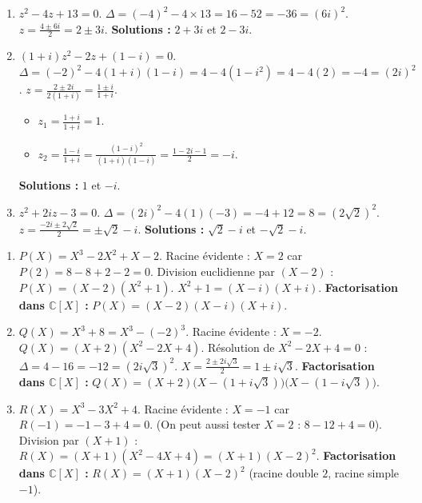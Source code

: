 \documentclass[11pt]{article}
\begin{document}
\begin{corrige}
\begin{enumerate}
\item $z^2 - 4z + 13 = 0$. $\Delta = (-4)^2 - 4 \times 13 = 16 - 52 = -36 = (6i)^2$.
$z = \frac{4 \pm 6i}{2} = 2 \pm 3i$.
\textbf{Solutions :} $\boxed{2+3i}$ et $\boxed{2-3i}$.

\item $(1+i)z^2 - 2z + (1-i) = 0$.
$\Delta = (-2)^2 - 4(1+i)(1-i) = 4 - 4(1 - i^2) = 4 - 4(2) = -4 = (2i)^2$.
$z = \frac{2 \pm 2i}{2(1+i)} = \frac{1 \pm i}{1+i}$.
\begin{itemize}
\item $z_1 = \frac{1+i}{1+i} = 1$.
\item $z_2 = \frac{1-i}{1+i} = \frac{(1-i)^2}{(1+i)(1-i)} = \frac{1 - 2i - 1}{2} = -i$.
\end{itemize}
\textbf{Solutions :} $\boxed{1}$ et $\boxed{-i}$.

\item $z^2 + 2iz - 3 = 0$.
$\Delta = (2i)^2 - 4(1)(-3) = -4 + 12 = 8 = (2\sqrt{2})^2$.
$z = \frac{-2i \pm 2\sqrt{2}}{2} = \pm \sqrt{2} - i$.
\textbf{Solutions :} $\boxed{\sqrt{2} - i}$ et $\boxed{-\sqrt{2} - i}$.
\end{enumerate}
\end{corrige}

\begin{corrige}
\begin{enumerate}
\item $P(X) = X^3 - 2X^2 + X - 2$.
Racine évidente : $X=2$ car $P(2) = 8 - 8 + 2 - 2 = 0$.
Division euclidienne par $(X-2)$ : $P(X) = (X-2)(X^2 + 1)$.
$X^2+1 = (X-i)(X+i)$.
\textbf{Factorisation dans $\mathbb{C}[X]$ :} $\boxed{P(X) = (X-2)(X-i)(X+i)}$.

\item $Q(X) = X^3 + 8 = X^3 - (-2)^3$. Racine évidente : $X = -2$.
$Q(X) = (X+2)(X^2 - 2X + 4)$.
Résolution de $X^2 - 2X + 4 = 0$ : $\Delta = 4 - 16 = -12 = (2i\sqrt{3})^2$.
$X = \frac{2 \pm 2i\sqrt{3}}{2} = 1 \pm i\sqrt{3}$.
\textbf{Factorisation dans $\mathbb{C}[X]$ :} $\boxed{Q(X) = (X+2)\bigl(X - (1+i\sqrt{3})\bigr)\bigl(X - (1-i\sqrt{3})\bigr)}$.

\item $R(X) = X^3 - 3X^2 + 4$.
Racine évidente : $X=-1$ car $R(-1) = -1 - 3 + 4 = 0$. (On peut aussi tester $X=2$ : $8-12+4=0$).
Division par $(X+1)$ : $R(X) = (X+1)(X^2 - 4X + 4) = (X+1)(X-2)^2$.
\textbf{Factorisation dans $\mathbb{C}[X]$ :} $\boxed{R(X) = (X+1)(X-2)^2}$ (racine double $2$, racine simple $-1$).
\end{enumerate}
\end{corrige}
\end{document}

